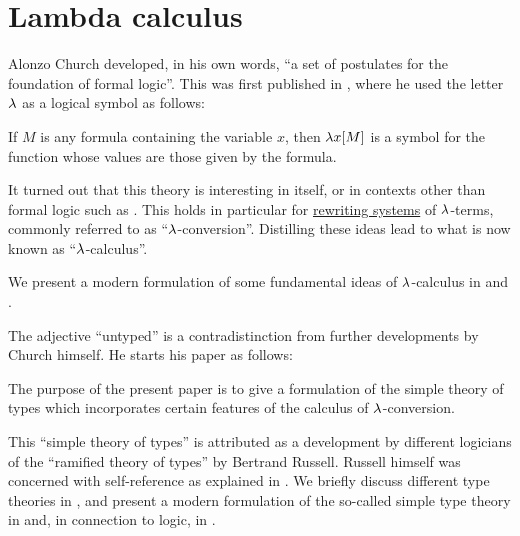 \chapter{Lambda calculus}\label{ch:lambda_calculus}

Alonzo Church developed, in his own words, \enquote{a set of postulates for the foundation of formal logic}. This was first published in \cite{Church1932Untyped}, where he used the letter \( \mathrm{\lambda} \) as a logical symbol as follows:
\begin{displayquote}
  If \( M \) is any formula containing the variable \( x \), then \( \mathrm{\lambda} x [M] \) is a symbol for the function whose values are those given by the formula.
\end{displayquote}

It turned out that this theory is interesting in itself, or in contexts other than formal logic such as . This holds in particular for \hyperref[def:rewriting_system]{rewriting systems} of \( \mathrm{\lambda} \)-terms, commonly referred to as \enquote{\( \mathrm{\lambda} \)-conversion}. Distilling these ideas lead to what is now known as \enquote{\( \mathrm{\lambda} \)-calculus}.

We present a modern formulation of some fundamental ideas of \( \mathrm{\lambda} \)-calculus in  and .

The adjective \enquote{untyped} is a contradistinction from further developments by Church himself. He starts his paper \cite{Church1940STT} as follows:
\begin{displayquote}
  The purpose of the present paper is to give a formulation of the simple theory of types which incorporates certain features of the calculus of \( \mathrm{\lambda} \)-conversion.
\end{displayquote}

This \enquote{simple theory of types} is attributed as a development by different logicians of the \enquote{ramified theory of types} by Bertrand Russell. Russell himself was concerned with self-reference as explained in . We briefly discuss different type theories in , and present a modern formulation of the so-called simple type theory in  and, in connection to logic, in .
